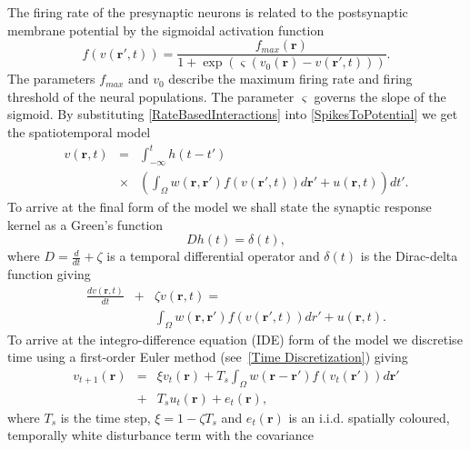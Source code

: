 \documentclass[12pt]{iopart}
\begin{document}
The firing rate of the presynaptic neurons is related to the postsynaptic membrane potential by the sigmoidal activation function 
\begin{equation}
	\label{ActivationFunction} f\left( v\left( \mathbf{r}', t \right) \right) = \frac{f_{max}\left(\mathbf{r}\right)}{1 + \exp \left( \varsigma \left( v_0\left( \mathbf{r} \right) - v\left(\mathbf{r}',t\right) \right) \right)}. 
\end{equation}
The parameters $f_{max}$ and $v_0$ describe the maximum firing rate and firing threshold of the neural populations. The parameter $\varsigma$ governs the slope of the sigmoid. By substituting \ref{RateBasedInteractions} into \ref{SpikesToPotential} we get the spatiotemporal model 
\begin{eqnarray}
	\label{FullDoubleIntModel} v\left(\mathbf{r},t\right) &=&  \int_{-\infty}^t h\left(t - t'\right) \\
	&\times&\left(\int_\Omega w\left(\mathbf{r},\mathbf{r}'\right) f\left( v\left( \mathbf{r}',t \right)\right)d\mathbf{r}' + u(\mathbf{r},t) \right)dt'. \nonumber
\end{eqnarray}
To arrive at the final form of the model we shall state the synaptic response kernel as a Green's function 
\begin{equation}
	\label{GreensFuncDef} Dh\left( t \right) = \delta \left( t \right), 
\end{equation}
where $D=\frac{d}{dt} + \zeta$ is a temporal differential operator and $\delta(t)$ is the Dirac-delta function giving 
\begin{eqnarray}
	\label{FinalFormContinuous} \frac{dv\left( \mathbf{r},t \right)}{dt} &+& \zeta v\left( \mathbf{r},t \right) = \\
	&&\int_\Omega {w\left( \mathbf{r},\mathbf{r}' \right)f\left( {v\left( \mathbf{r}',t \right)} \right)dr'} + u\left(\mathbf{r},t\right). \nonumber
\end{eqnarray}
To arrive at the integro-difference equation (IDE) form of the model we discretise time using a first-order Euler method (see~\ref{Time Discretization}) giving 
\begin{eqnarray}
	\label{DiscreteTimeModel} v_{t+1}\left(\mathbf{r}\right) &=& \xi v_t\left(\mathbf{r}\right) + T_s \int_\Omega { w\left(\mathbf{r}-\mathbf{r}'\right) f\left(v_t\left(\mathbf{r}'\right)\right) d\mathbf{r}'} \nonumber\\ 
	&+& T_s u_t\left(\mathbf{r}\right) + e_t\left(\mathbf{r}\right), 
\end{eqnarray}
where $T_s$ is the time step, $\xi = 1-\zeta T_s$ and $e_t\left(\mathbf{r}\right)$ is an i.i.d. spatially coloured, temporally white disturbance term with the covariance 
\end{document}
